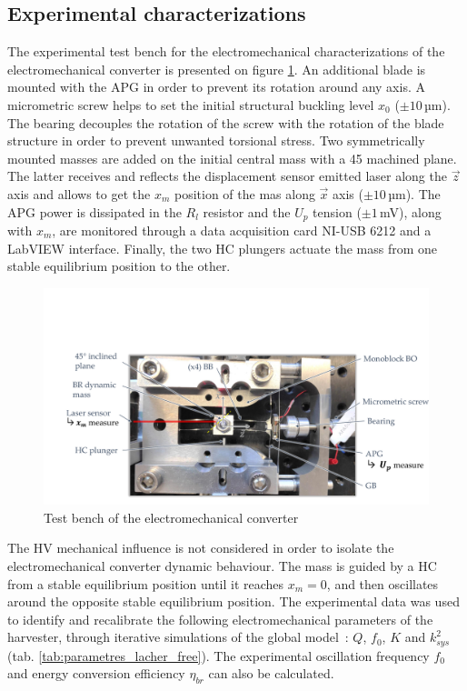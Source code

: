 \documentclass[3p,twocolumn,preprint]{elsarticle}
\begin{document}
	\subsection{Experimental characterizations}	
	\label{subsec:Experimental characterizations}
The experimental test bench for the electromechanical characterizations of the electromechanical converter is presented on figure \ref{fig:BDT_OB+GPA}. An additional blade is mounted with the APG in order to prevent its rotation around any axis. A micrometric screw helps to set the initial structural buckling level $x_0$ ($\pm 10$\,µm). The bearing decouples the rotation of the screw with the rotation of the blade structure in order to prevent unwanted torsional stress. Two symmetrically mounted masses are added on the initial central mass with a 45\degree{} machined plane. The latter receives and reflects the displacement sensor emitted laser along the $\vec{z}$ axis and allows to get the $x_m$ position of the mas along $\vec{x}$ axis ($\pm 10$\,µm). The APG power is dissipated in the $R_l$ resistor and the $U_p$ tension ($\pm 1$\,mV), along with $x_m$, are monitored through a data acquisition card NI-USB 6212 and a LabVIEW interface. Finally, the two HC plungers actuate the mass from one stable equilibrium position to the other.
\begin{figure}[!htbp]
	\centering
	\captionsetup{justification=centering}
	\includegraphics[trim={2cm 0cm 0cm 5.5cm},clip,width=\linewidth]{figures/BDT_OB+GPA.pdf}
	\caption{Test bench of the electromechanical converter}
	\label{fig:BDT_OB+GPA}
\end{figure}
The HV mechanical influence is not considered in order to isolate the electromechanical converter dynamic behaviour. The mass is guided by a HC from a stable equilibrium position until it reaches \mbox{$x_m=0$}, and then oscillates around the opposite stable equilibrium position. The experimental data was used to identify and recalibrate the following electromechanical parameters of the harvester, through iterative simulations of the global \mbox{model :} $Q$, $f_0$, $K$ and $k_{sys}^2$ (tab. \ref{tab:parametres_lacher_free}). The experimental oscillation frequency $f_0$ and energy conversion efficiency $\eta_{br}$ can also be calculated.
\end{document}
